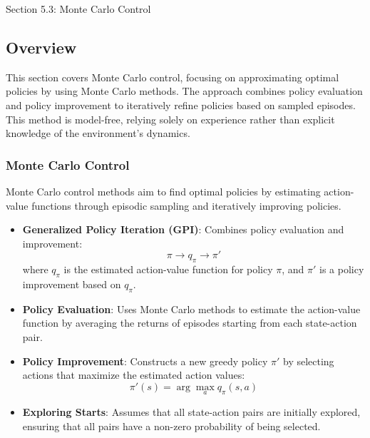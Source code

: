 \begin{notes}{Section 5.3: Monte Carlo Control}
    \subsection*{Overview}

    This section covers Monte Carlo control, focusing on approximating optimal policies by using Monte Carlo methods. The approach combines policy evaluation and policy improvement to iteratively refine 
    policies based on sampled episodes. This method is model-free, relying solely on experience rather than explicit knowledge of the environment's dynamics.
    
    \subsubsection*{Monte Carlo Control}
    
    Monte Carlo control methods aim to find optimal policies by estimating action-value functions through episodic sampling and iteratively improving policies.
    
    \begin{highlight}
    
        \begin{itemize}
            \item \textbf{Generalized Policy Iteration (GPI)}: Combines policy evaluation and improvement:
                \[
                \pi \rightarrow q_\pi \rightarrow \pi'
                \]
                where $q_\pi$ is the estimated action-value function for policy $\pi$, and $\pi'$ is a policy improvement based on $q_\pi$.
            \item \textbf{Policy Evaluation}: Uses Monte Carlo methods to estimate the action-value function by averaging the returns of episodes starting from each state-action pair.
            \item \textbf{Policy Improvement}: Constructs a new greedy policy $\pi'$ by selecting actions that maximize the estimated action values:
                \[
                \pi'(s) = \arg\max_a q_\pi(s, a)
                \]
            \item \textbf{Exploring Starts}: Assumes that all state-action pairs are initially explored, ensuring that all pairs have a non-zero probability of being selected.
        \end{itemize}
    
    \end{highlight}
    

\end{notes}
